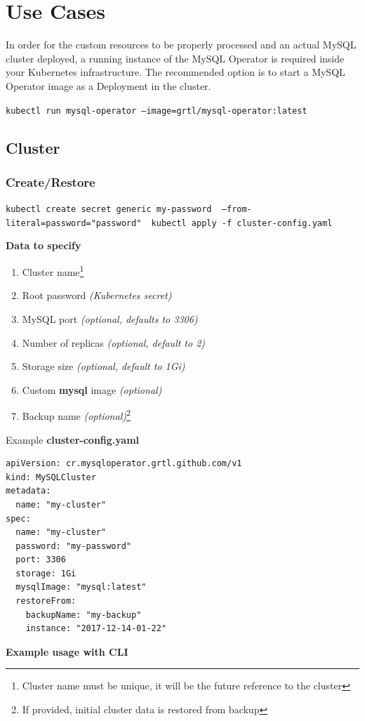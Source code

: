 \section{Use Cases}
In order for the custom resources to be properly processed and an actual MySQL cluster deployed, a
running instance of the MySQL Operator is required inside your Kubernetes infrastructure. The
recommended option is to start a MySQL Operator image as a Deployment in the cluster.

\texttt{kubectl run mysql-operator --image=grtl/mysql-operator:latest}

\subsection{Cluster}
\subsubsection*{Create/Restore}
\texttt{kubectl create secret generic my-password \ \newline --from-literal=password="password" \
\newline kubectl apply -f cluster-config.yaml}


\noindent \textbf{Data to specify}
\begin{enumerate}
	\item Cluster name\footnote{Cluster name must be unique, it will be the future reference
	to the cluster}
	\item Root password \textit{(Kubernetes secret)}
	\item MySQL port \textit{(optional, defaults to 3306)}
	\item Number of replicas \textit{(optional, default to 2)}
	\item Storage size \textit{(optional, default to 1Gi)}
	\item Custom \textbf{mysql} image \textit{(optional)}
	\item Backup name \textit{(optional)}\footnote{If provided, initial cluster data is restored
	from backup}
\end{enumerate}

\noindent Example \textbf{cluster-config.yaml}
\begin{lstlisting}[caption=cluster-config.yaml,captionpos=b]
apiVersion: cr.mysqloperator.grtl.github.com/v1
kind: MySQLCluster
metadata:
  name: "my-cluster"
spec:
  name: "my-cluster"
  password: "my-password"
  port: 3306
  storage: 1Gi
  mysqlImage: "mysql:latest"
  restoreFrom: 
	backupName: "my-backup"
	instance: "2017-12-14-01-22"
\end{lstlisting}
\textbf{Example usage with CLI}

